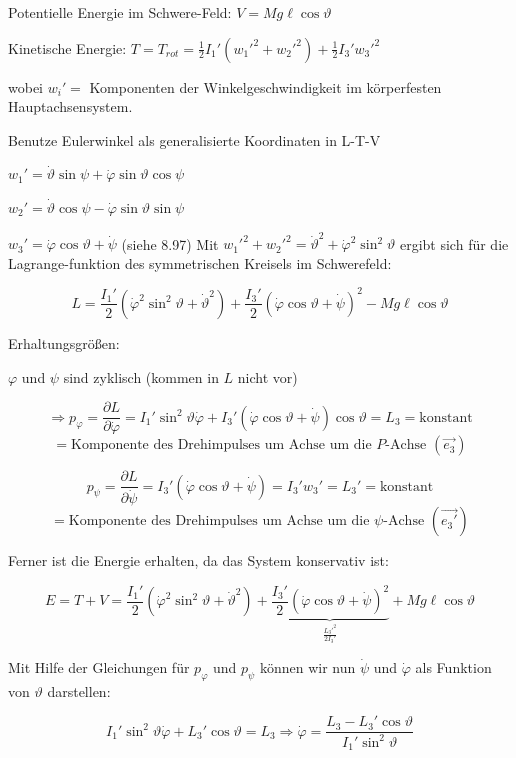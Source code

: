 \documentclass[10pt, letterpaper]{article}
\begin{document}
Potentielle Energie im Schwere-Feld: $V = Mg\ell \cos\vartheta$

Kinetische Energie: $T = T_{rot} = \frac{1}{2}I_1'(w_1'^2 + w_2'^2) + \frac{1}{2}I_3'w_3'^2$

wobei $w_i' =$ Komponenten der Winkelgeschwindigkeit im körperfesten Hauptachsensystem.

Benutze Eulerwinkel als generalisierte Koordinaten in L-T-V

$w_1' = \dot{\vartheta}\sin\psi + \dot{\varphi}\sin\vartheta\cos\psi$

$w_2' = \dot{\vartheta}\cos\psi - \dot{\varphi}\sin\vartheta\sin\psi$

$w_3' = \dot{\varphi}\cos\vartheta + \dot{\psi}$ \hspace{2cm} (siehe 8.97)
Mit $w_1'^2 + w_2'^2 = \dot{\vartheta}^2 + \dot{\varphi}^2\sin^2\vartheta$ ergibt sich für die Lagrange-funktion des symmetrischen Kreisels im Schwerefeld:

\[
L = \frac{I_1'}{2}(\dot{\varphi}^2\sin^2\vartheta + \dot{\vartheta}^2) + \frac{I_3'}{2}(\dot{\varphi}\cos\vartheta + \dot{\psi})^2 - Mg\ell\cos\vartheta
\]

Erhaltungsgrößen:

$\varphi$ und $\psi$ sind zyklisch (kommen in $L$ nicht vor)

\[\Rightarrow p_\varphi = \frac{\partial L}{\partial \dot{\varphi}} = I_1'\sin^2\vartheta\dot{\varphi} + I_3'(\dot{\varphi}\cos\vartheta + \dot{\psi})\cos\vartheta = L_3 = \text{konstant}\]
\[= \text{Komponente des Drehimpulses um Achse um die }P\text{-Achse } (\vec{e_3})\]

\[p_\psi = \frac{\partial L}{\partial \dot{\psi}} = I_3'(\dot{\varphi}\cos\vartheta + \dot{\psi}) = I_3'w_3' = L_3' = \text{konstant}\]
\[= \text{Komponente des Drehimpulses um Achse um die }\psi\text{-Achse } (\vec{e_3'})\]

Ferner ist die Energie erhalten, da das System konservativ ist:

\[E = T + V = \frac{I_1'}{2}(\dot{\varphi}^2\sin^2\vartheta + \dot{\vartheta}^2) + \underbrace{\frac{I_3'}{2}(\dot{\varphi}\cos\vartheta + \dot{\psi})^2}_{\frac{L_3'^2}{2I_3'}} + Mg\ell\cos\vartheta\]

Mit Hilfe der Gleichungen für $p_\varphi$ und $p_\psi$ können wir nun $\dot{\psi}$ und $\dot{\varphi}$ als Funktion von $\vartheta$ darstellen:

\[I_1'\sin^2\vartheta\dot{\varphi} + L_3'\cos\vartheta = L_3 \Rightarrow \dot{\varphi} = \frac{L_3 - L_3'\cos\vartheta}{I_1'\sin^2\vartheta} \tag{1}\]
\end{document}
